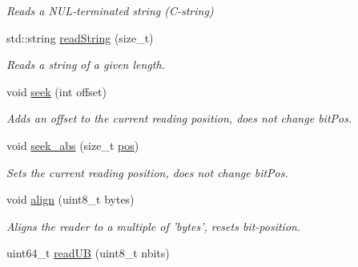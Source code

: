 \begin{DoxyCompactItemize}
\begin{DoxyCompactList}\small\item\em Reads a N\+U\+L-\/terminated string (C-\/string) \end{DoxyCompactList}\item 
\hypertarget{classjswf_1_1io_1_1_string_reader_a404dbc73f76fdf1c27d5e0526530babe}{std\+::string \hyperlink{classjswf_1_1io_1_1_string_reader_a404dbc73f76fdf1c27d5e0526530babe}{read\+String} (size\+\_\+t)}\label{classjswf_1_1io_1_1_string_reader_a404dbc73f76fdf1c27d5e0526530babe}

\begin{DoxyCompactList}\small\item\em Reads a string of a given length. \end{DoxyCompactList}\item 
void \hyperlink{classjswf_1_1io_1_1_string_reader_ab695ac277d141b4bb4ff4aa79143ef84}{seek} (int offset)
\begin{DoxyCompactList}\small\item\em Adds an offset to the current reading position, does not change {\ttfamily bit\+Pos}. \end{DoxyCompactList}\item 
void \hyperlink{classjswf_1_1io_1_1_string_reader_a6a51bd9cd491ba5cb57cc24ef9f2a389}{seek\+\_\+abs} (size\+\_\+t \hyperlink{classjswf_1_1io_1_1_generic_reader_a29dcfa1317485ea04e6caef568e803ce}{pos})
\begin{DoxyCompactList}\small\item\em Sets the current reading position, does not change {\ttfamily bit\+Pos}. \end{DoxyCompactList}\item 
\hypertarget{classjswf_1_1io_1_1_string_reader_a355a2aab277f71ef59d4cc4afec44d84}{void \hyperlink{classjswf_1_1io_1_1_string_reader_a355a2aab277f71ef59d4cc4afec44d84}{align} (uint8\+\_\+t bytes)}\label{classjswf_1_1io_1_1_string_reader_a355a2aab277f71ef59d4cc4afec44d84}

\begin{DoxyCompactList}\small\item\em Aligns the reader to a multiple of 'bytes', resets bit-\/position. \end{DoxyCompactList}\item 
\hypertarget{classjswf_1_1io_1_1_string_reader_a796d972ec02d45b475bac1e9c6575195}{uint64\+\_\+t \hyperlink{classjswf_1_1io_1_1_string_reader_a796d972ec02d45b475bac1e9c6575195}{read\+U\+B} (uint8\+\_\+t nbits)}\label{classjswf_1_1io_1_1_string_reader_a796d972ec02d45b475bac1e9c6575195}


\end{DoxyCompactItemize}
